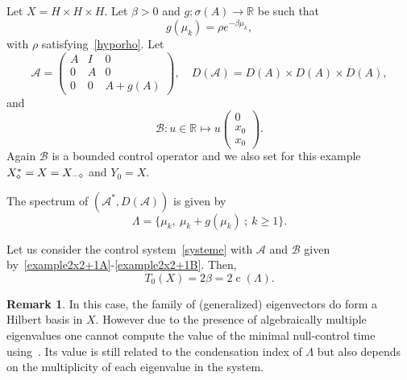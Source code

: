 \documentclass[10pt]{amsart}
\theoremstyle{definition}\newtheorem{defi}[theo]{Definition}\newtheorem{rema}[theo]{Remark}\newtheorem{exam}[theo]{Example}\newtheorem{exem}[theo]{Example}\newtheorem{nota}[theo]{Notation}
\newcommand\A{\mathcal{A}}
\newcommand\As{\mathcal{A}^*}
\newcommand\B{\mathcal{B}}
\newcommand{\DA}{D(\A)}
\newcommand{\Xalphas}{X_\diamond^*}
\newcommand{\Xmalpha}{X_{-\diamond}}
\newcommand{\Fzp}{Y_0}
\newcommand{\R}{\mathbb{R}}
\DeclareMathOperator{\cond}{c}
\begin{document}
Let $X=H\times H\times H$. Let $\beta>0$ and $g : \sigma(A) \to \R$ be such that
\begin{equation}\label{Def_g_1}
g(\mu_k) = \rho e^{-\beta \mu_k},
\end{equation}
with $\rho$ satisfying~\eqref{hyporho}. Let
\begin{equation}\label{example2x2+1A}
\A=
\begin{pmatrix} A & I & 0 \\ 0 & A & 0 \\ 0 & 0 &A+g(A)
\end{pmatrix},
\quad
\DA=D(A)\times D(A)\times D(A),
\end{equation}
and
\begin{equation}\label{example2x2+1B}
\B : u \in \R \mapsto u
\begin{pmatrix} 0 \\ x_0 \\ x_0
\end{pmatrix}.
\end{equation}
Again $\B$ is a bounded control operator and we also set for this example $\Xalphas = X\linebreak= \Xmalpha$ and $\Fzp=X$.

The spectrum of $(\As, \DA)$ is given by
\[
\Lambda = \{ \mu_k, \: \mu_k+g(\mu_k) \: ; \: k \geq 1\}.
\]

\begin{prop}\label{Prop:Academique2}
Let us consider the control system~\eqref{systeme} with $\A$ and $\B$ given by~\eqref{example2x2+1A}-\eqref{example2x2+1B}. Then,
\begin{equation}\label{T0_Academique2}
T_0(X) = 2\beta = 2 \cond(\Lambda).
\end{equation}
\end{prop}

\begin{rema}
In this case, the family of (generalized) eigenvectors do form a Hilbert basis in $X$. However due to the presence of algebraically multiple eigenvalues one cannot compute the value of the minimal null-control time using~\cite{AmmarKhodjaBenabdallahGonzalez-BurgosdeTeresa:2014}. Its value is still related to the condensation index of $\Lambda$ but also depends on the multiplicity of each eigenvalue in the system.
\end{rema}
\end{document}
